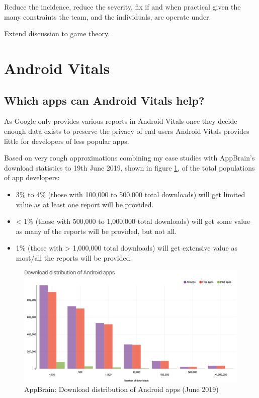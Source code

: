 Reduce the incidence, reduce the severity, fix if and when practical given the many constraints the team, and the individuals,  are operate under.


Extend discussion to game theory.



\section{Android Vitals}
\subsection{Which apps can Android Vitals help?}
As Google only provides various reports in Android Vitals once they decide enough data exists to preserve the privacy of end users Android Vitals provides little for developers of less popular apps. 

Based on very rough approximations combining my case studies with AppBrain's download statistics to 19th June 2019, shown in figure \ref{fig:appbrain_download_statistics_jun_2019}\cite{appbrain_download_statistics_june_2019}, of the total populations of app developers:
\begin{itemize}
    \item 3\% to 4\% (those with 100,000 to 500,000 total downloads) will get limited value as at least one report will be provided.
    \item < 1\% (those with 500,000 to 1,000,000 total downloads) will get some value as many of the reports will be provided, but not all.
    \item 1\% (those with > 1,000,000 total downloads) will get extensive value as most/all the reports will be provided.
\end{itemize}

\begin{figure}[!htbp]
    \centering
    \includegraphics[width=\textwidth, keepaspectratio]{images/appbrain/AppBrain_Download_Statistics_20-Jun-2019.png}
    \caption{AppBrain: Download distribution of Android apps (June 2019)}
    \label{fig:appbrain_download_statistics_jun_2019}
\end{figure}

